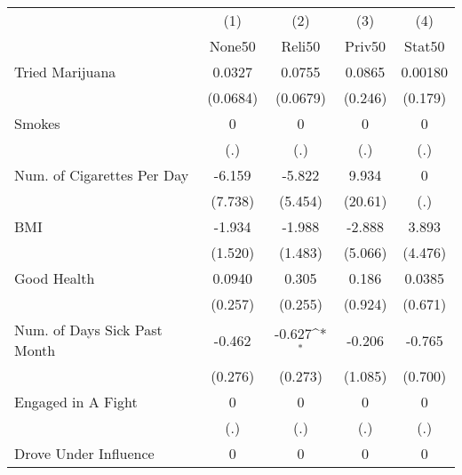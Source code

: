 {
\def\sym#1{\ifmmode^{#1}\else\(^{#1}\)\fi}
\begin{tabular}{l*{4}{c}}
\hline\hline
            &\multicolumn{1}{c}{(1)}&\multicolumn{1}{c}{(2)}&\multicolumn{1}{c}{(3)}&\multicolumn{1}{c}{(4)}\\
            &\multicolumn{1}{c}{None50}&\multicolumn{1}{c}{Reli50}&\multicolumn{1}{c}{Priv50}&\multicolumn{1}{c}{Stat50}\\
\hline
Tried Marijuana&      0.0327         &      0.0755         &      0.0865         &     0.00180         \\
            &    (0.0684)         &    (0.0679)         &     (0.246)         &     (0.179)         \\
[1em]
Smokes      &           0         &           0         &           0         &           0         \\
            &         (.)         &         (.)         &         (.)         &         (.)         \\
[1em]
Num. of Cigarettes Per Day&      -6.159         &      -5.822         &       9.934         &           0         \\
            &     (7.738)         &     (5.454)         &     (20.61)         &         (.)         \\
[1em]
BMI         &      -1.934         &      -1.988         &      -2.888         &       3.893         \\
            &     (1.520)         &     (1.483)         &     (5.066)         &     (4.476)         \\
[1em]
Good Health &      0.0940         &       0.305         &       0.186         &      0.0385         \\
            &     (0.257)         &     (0.255)         &     (0.924)         &     (0.671)         \\
[1em]
Num. of Days Sick Past Month&      -0.462         &      -0.627\sym{*}  &      -0.206         &      -0.765         \\
            &     (0.276)         &     (0.273)         &     (1.085)         &     (0.700)         \\
[1em]
Engaged in A Fight&           0         &           0         &           0         &           0         \\
            &         (.)         &         (.)         &         (.)         &         (.)         \\
[1em]
Drove Under Influence&           0         &           0         &           0         &           0         \\

\end{tabular}}
